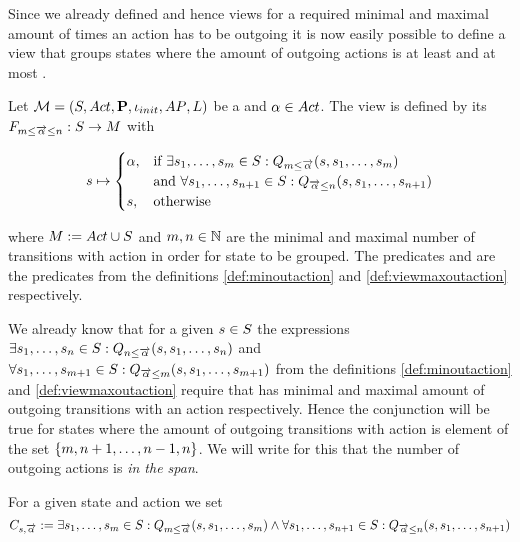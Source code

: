\documentclass[preview]{standalone}
\begin{document}
Since we already defined \grpfctsN and hence views for a required minimal and maximal amount of times an action has to be outgoing it is now easily possible to define a view that groups states where the amount of outgoing actions is at least \numoutact and at most \numoutactb. 

\begin{definition}
	Let $\chgph = \chgphtuple$ be a \chosengraphtypeN and $\action \in \actions$. The view 
	\viewspanoutaction is defined by its \grpfctN $\gfctspanoutaction : \states \to \arbset$ with
	
	\[
	\state \mapsto
	\begin{cases}
		\action,				& \text{if } \exists \state_1, \dots, \state_\numoutactb \in \states: \predminoutact[\numoutactb] \\ &\text{and } \forall \state_1, \dots, \state_{\numoutact+1} \in \states: \predmaxoutact \\
		\state,          	& \text{otherwise}
	\end{cases}
	\]
	
	where $\imggrp := \actions \cup \states$ and $\numoutactb, \numoutact \in \natnums$ are the minimal and maximal number of transitions with action \action in order for state to be grouped. The predicates \predminoutact and \predmaxoutact are the predicates from the definitions \ref{def:minoutaction} and \ref{def:viewmaxoutaction} respectively.
\end{definition}

We already know that for a given $\state \in \states$ the expressions $\exists \state_1, \dots, \state_\numoutact \in \states: \predminoutact$ and $\forall \state_1, \dots, \state_{\numoutactb+1} \in \states: \predmaxoutact[\numoutactb]$ from the definitions \ref{def:minoutaction} and \ref{def:viewmaxoutaction} require that \state has minimal and maximal amount of outgoing transitions with an action \action respectively. Hence the conjunction will be true for states where the amount of outgoing transitions with action \action is element of the set $\{\numoutactb, \numoutact+1, \dots, \numoutact-1, \numoutact\}$. We will write for this that the number of outgoing actions is \emph{in the span}.

For a given state \state and action \action we set
\[
\formoutact:= \exists \state_1, \dots, \state_\numoutactb \in \states: \predminoutact[\numoutactb]\land \\
\forall \state_1, \dots, \state_{\numoutact+1} \in \states: \predmaxoutact
\]
\end{document}
